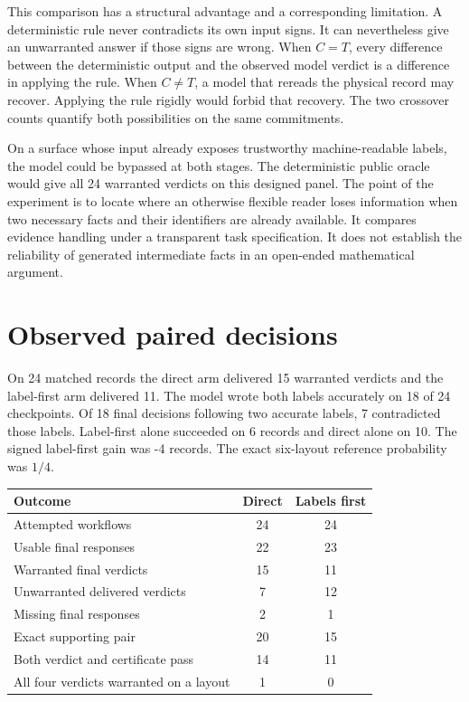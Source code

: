 \documentclass[12pt,letterpaper]{article}
\begin{document}
This comparison has a structural advantage and a corresponding limitation. A deterministic rule never contradicts its own input signs. It can nevertheless give an unwarranted answer if those signs are wrong. When $C=T$, every difference between the deterministic output and the observed model verdict is a difference in applying the rule. When $C\ne T$, a model that rereads the physical record may recover. Applying the rule rigidly would forbid that recovery. The two crossover counts quantify both possibilities on the same commitments.

On a surface whose input already exposes trustworthy machine-readable labels, the model could be bypassed at both stages. The deterministic public oracle would give all 24 warranted verdicts on this designed panel. The point of the experiment is to locate where an otherwise flexible reader loses information when two necessary facts and their identifiers are already available. It compares evidence handling under a transparent task specification. It does not establish the reliability of generated intermediate facts in an open-ended mathematical argument.


\section{Observed paired decisions}

On 24 matched records the direct arm delivered 15 warranted verdicts and the label-first arm delivered 11. The model wrote both labels accurately on 18 of 24 checkpoints. Of 18 final decisions following two accurate labels, 7 contradicted those labels. Label-first alone succeeded on 6 records and direct alone on 10. The signed label-first gain was -4 records. The exact six-layout reference probability was $1/4$.

\begin{center}{\small\setlength{\tabcolsep}{4pt}\begin{tabularx}{\linewidth}{@{}Ycc@{}}\toprule
Outcome & Direct & Labels first\\ \midrule
Attempted workflows & 24 & 24\\
Usable final responses & 22 & 23\\
Warranted final verdicts & 15 & 11\\
Unwarranted delivered verdicts & 7 & 12\\
Missing final responses & 2 & 1\\
Exact supporting pair & 20 & 15\\
Both verdict and certificate pass & 14 & 11\\
All four verdicts warranted on a layout & 1 & 0\\
\bottomrule\end{tabularx}}\end{center}
\end{document}
